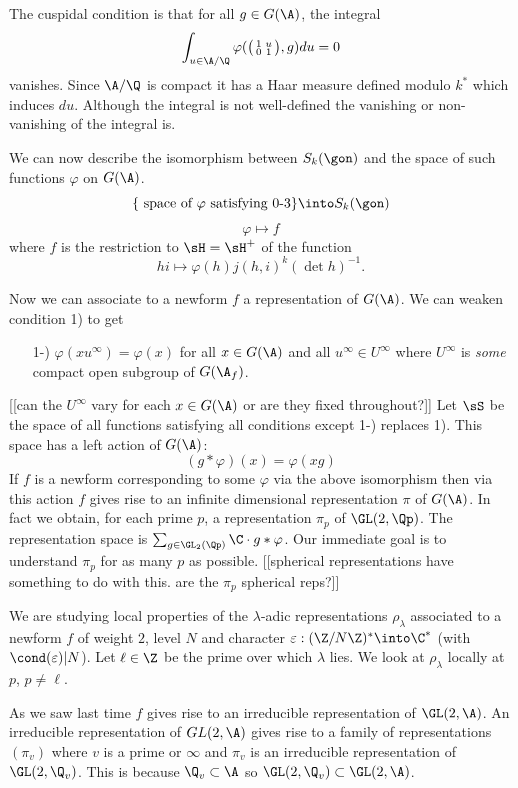 \documentclass{report}
\begin{document}
The cuspidal condition is that for all $g\in G(\A)$, the integral
$$\int_{u\in\A/\Q} \varphi(\bigl(\begin{smallmatrix}1&u\\0&1\end{smallmatrix}\bigr),g)du=0$$
vanishes. Since $\A/\Q$ is compact it has a Haar measure defined modulo
$k^{*}$ which induces $du$. Although the integral is not well-defined
the vanishing or non-vanishing of the integral is.

We can now describe the isomorphism between $S_k(\gon)$ and the space
of such functions $\varphi$ on $G(\A)$.
$$\{\text{ space of $\varphi$ satisfying 0-3}\}\into S_k(\gon)$$
$$\varphi\mapsto f$$
where $f$ is the restriction to $\sH=\sH^{+}$ of the function
$$hi\mapsto\varphi(h)j(h,i)^k(\det h)^{-1}.$$

Now we can associate to a newform $f$ a representation of
$G(\A)$. We can weaken condition 1) to get
\begin{itemize}
\item[1-)] $\varphi(xu^{\infty})=\varphi(x)$ for all $x\in G(\A)$
and all $u^{\infty}\in U^{\infty}$ where $U^{\infty}$ is
{\em some} compact open subgroup of $G(\A_f)$.
\end{itemize}
[[can the $U^{\infty}$ vary for each $x\in G(\A)$ or
are they fixed throughout?]]
Let $\sS$ be the space of all functions satisfying all
conditions except 1-) replaces 1).
This space has a left action of $G(\A)$:
$$(g*\varphi)(x)=\varphi(xg)$$
If $f$ is a newform corresponding to some $\varphi$ via
the above isomorphism then via this action $f$ gives rise to an infinite
dimensional representation $\pi$ of $G(\A)$. In fact
we obtain, for each prime $p$, a representation $\pi_p$
of $\GL(2,\Qp)$. The representation space is
$\sum_{g\in\GL_2(\Qp)}\C\cdot{}g*\varphi$. Our immediate
goal is to understand $\pi_p$ for as many $p$ as possible.
[[spherical representations have something to do with
this. are the $\pi_p$ spherical reps?]]


We are studying local properties of the $\lambda$-adic representations
$\rho_{\lambda}$ associated to a newform $f$ of weight $2$, level
$N$ and character $\varepsilon:(\Z/N\Z)^*\into\C^*$
(with $\cond(\varepsilon)|N$). Let $\ell\in\Z$ be the prime over which
$\lambda$ lies. We look at $\rho_{\lambda}$ locally at $p$, $p\neq\ell$.

As we saw last time $f$ gives rise to an irreducible representation
of $\GL(2,\A)$. An irreducible representation of $GL(2,\A)$ gives rise
to a family of representations $(\pi_v)$ where $v$ is a prime
or $\infty$ and $\pi_v$ is an irreducible representation of $\GL(2,\Q_v)$.
This is because $\Q_v\subset\A$ so $\GL(2,\Q_v)\subset\GL(2,\A)$.
\end{document}
